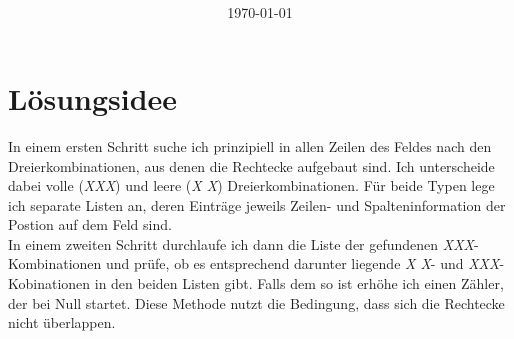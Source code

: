 \documentclass[a4paper,10pt,ngerman]{scrartcl}
\title{\textbf{\Huge\Aufgabe}}
\author{\LARGE \Namen\\\\}
\date{\LARGE\today}
\begin{document}
\maketitle
\tableofcontents

\vspace{0.5cm}

\section{Lösungsidee}
In einem ersten Schritt suche ich prinzipiell in allen Zeilen des Feldes nach den Dreierkombinationen, aus denen die Rechtecke aufgebaut sind. Ich unterscheide dabei volle (\textit{XXX}) und leere (\textit{X X}) Dreierkombinationen. Für beide Typen lege ich separate Listen an, deren Einträge jeweils Zeilen- und Spalteninformation der Postion auf dem Feld sind.\\
In einem zweiten Schritt durchlaufe ich dann die Liste der gefundenen \textit{XXX}-Kombinationen und prüfe, ob es entsprechend darunter liegende \textit{X X}- und \textit{XXX}-Kobinationen in den beiden Listen gibt. Falls dem so ist erhöhe ich einen Zähler, der bei Null startet.    
Diese Methode nutzt die Bedingung, dass sich die Rechtecke nicht überlappen.
\end{document}
